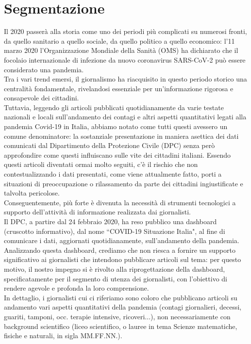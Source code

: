 \section{Segmentazione}
\label{s:segmentazione}
Il 2020 passerà alla storia come uno dei periodi più complicati su numerosi fronti, da quello sanitario a quello sociale, 
da quello politico a quello economico: l'11 marzo 2020 l'Organizzazione Mondiale della Sanità (OMS) ha dichiarato che il 
focolaio internazionale di infezione da nuovo coronavirus SARS-CoV-2 può essere considerato una pandemia.\\
Tra i vari trend emersi, il giornalismo ha riacquisito in questo periodo storico una centralità fondamentale, rivelandosi 
essenziale per un'informazione rigorosa e consapevole dei cittadini.\\
Tuttavia, leggendo gli articoli pubblicati quotidianamente da varie testate nazionali e locali sull'andamento dei contagi 
e altri aspetti quantitativi legati alla pandemia Covid-19 in Italia, abbiamo notato come tutti questi avessero un comune 
denominatore: la sostanziale presentazione in maniera asettica dei dati comunicati dal Dipartimento della Protezione Civile 
(DPC) senza però approfondire come questi influiscano sulle vite dei cittadini italiani. Essendo questi articoli diventati 
ormai molto seguiti, c'è il rischio che non contestualizzando i dati presentati, come viene attualmente fatto, porti a 
situazioni di preoccupazione o rilassamento da parte dei cittadini ingiustificate e talvolta pericolose.\\
Conseguentemente, più forte è divenuta la necessità di strumenti tecnologici a supporto dell'attività di informazione 
realizzata dai giornalisti.\\
Il DPC, a partire dal 24 febbraio 2020, ha reso pubblico una dashboard (cruscotto informativo), dal nome ``COVID-19 Situazione Italia", 
al fine di comunicare i dati, aggiornati quotidianamente, sull'andamento della pandemia.\\
Analizzando questa dashboard, crediamo che non riesca a fornire un supporto significativo ai giornalisti che intendono pubblicare 
articoli sul tema: per questo motivo, il nostro impegno si è rivolto alla riprogettazione della dashboard, specificatamente per il 
segmento di utenza dei giornalisti, con l'obiettivo di rendere agevole e profonda la loro comprensione.\\
In dettaglio, i giornalisti cui ci riferiamo sono coloro che pubblicano articoli su andamento vari aspetti quantitativi della 
pandemia (contagi giornalieri, decessi, guariti, tamponi, occ. terapie intensive, ricoveri...), non necessariamente con 
background scientifico (liceo scientifico, o lauree in tema Scienze matematiche, fisiche e naturali, in sigla MM.FF.NN.).